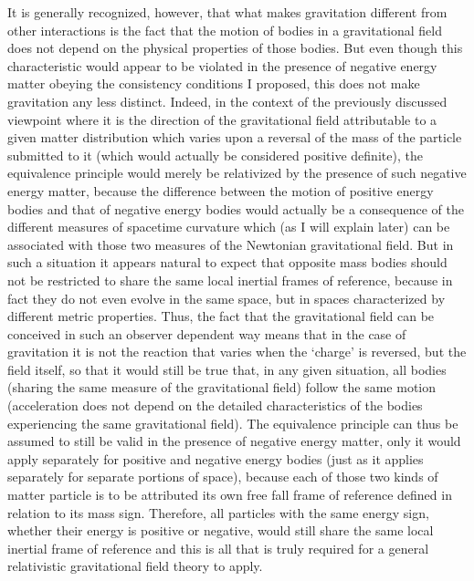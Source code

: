 \documentclass[notitlepage,12pt]{report}
\begin{document}
It is generally recognized, however, that what makes gravitation different from other interactions is the fact that the motion of bodies in a gravitational field does not depend on the physical properties of those bodies. But even though this characteristic would appear to be violated in the presence of negative energy matter obeying the consistency conditions I proposed, this does not make gravitation any less distinct. Indeed, in the context of the previously discussed viewpoint where it is the direction of the gravitational field attributable to a given matter distribution which varies upon a reversal of the mass of the particle submitted to it (which would actually be considered positive definite), the equivalence principle would merely be relativized by the presence of such negative energy matter, because the difference between the motion of positive energy bodies and that of negative energy bodies would actually be a consequence of the different measures of spacetime curvature which (as I will explain later) can be associated with those two measures of the Newtonian gravitational field. But in such a situation it appears natural to expect that opposite mass bodies should not be restricted to share the same local inertial frames of reference, because in fact they do not even evolve in the same space, but in spaces characterized by different metric properties. Thus, the fact that the gravitational field can be conceived in such an observer dependent way means that in the case of gravitation it is not the reaction that varies when the `charge' is reversed, but the field itself, so that it would still be true that, in any given situation, all bodies (sharing the same measure of the gravitational field) follow the same motion (acceleration does not depend on the detailed characteristics of the bodies experiencing the same gravitational field). The equivalence principle can thus be assumed to still be valid in the presence of negative energy matter, only it would apply separately for positive and negative energy bodies (just as it applies separately for separate portions of space), because each of those two kinds of matter particle is to be attributed its own free fall frame of reference defined in relation to its mass sign. Therefore, all particles with the same energy sign, whether their energy is positive or negative, would still share the same local inertial frame of reference and this is all that is truly required for a general relativistic gravitational field theory to apply.
\end{document}
